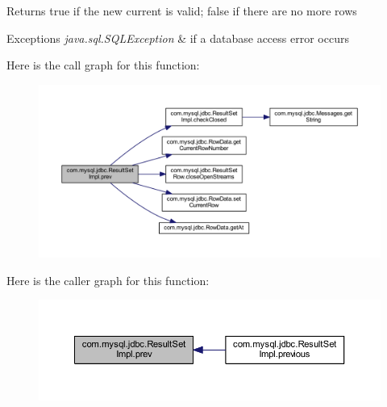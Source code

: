 \begin{DoxyReturn}{Returns}
true if the new current is valid; false if there are no more rows
\end{DoxyReturn}

\begin{DoxyExceptions}{Exceptions}
{\em java.\+sql.\+S\+Q\+L\+Exception} & if a database access error occurs \\
\hline
\end{DoxyExceptions}
Here is the call graph for this function\+:
\nopagebreak
\begin{figure}[H]
\begin{center}
\leavevmode
\includegraphics[width=350pt]{classcom_1_1mysql_1_1jdbc_1_1_result_set_impl_a6d8981c984b457ad7b9b38aa42db4a37_cgraph}
\end{center}
\end{figure}
Here is the caller graph for this function\+:
\nopagebreak
\begin{figure}[H]
\begin{center}
\leavevmode
\includegraphics[width=350pt]{classcom_1_1mysql_1_1jdbc_1_1_result_set_impl_a6d8981c984b457ad7b9b38aa42db4a37_icgraph}
\end{center}
\end{figure}
\mbox{\label{classcom_1_1mysql_1_1jdbc_1_1_result_set_impl_ab0f6bcd9030f72eaa84132e0387e6796}} 
